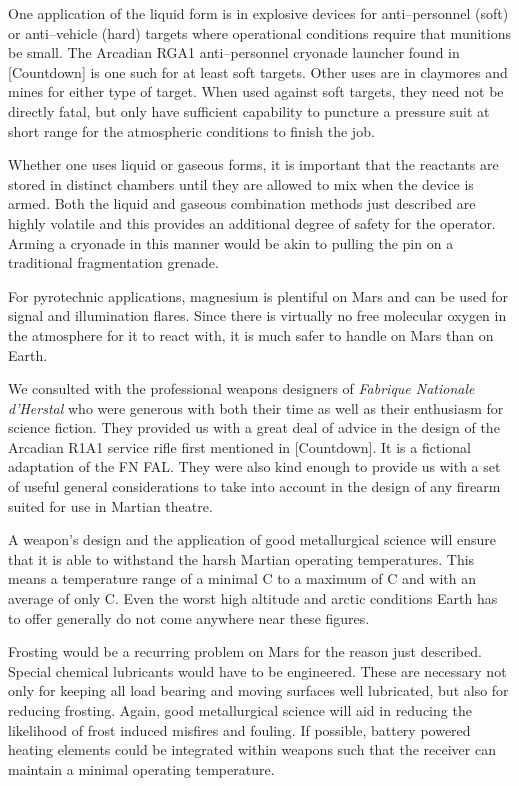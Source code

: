 One application of the liquid form is in explosive devices for anti--personnel (soft) or anti--vehicle (hard) targets where operational conditions require that munitions be small. The Arcadian RGA1 anti--personnel cryonade launcher found in [Countdown] is one such for at least soft targets. Other uses are in claymores and mines for either type of target. When used against soft targets, they need not be directly fatal, but only have sufficient capability to puncture a pressure suit at short range for the atmospheric conditions to finish the job.

Whether one uses liquid or gaseous forms, it is important that the reactants are stored in distinct chambers until they are allowed to mix when the device is armed. Both the liquid and gaseous combination methods just described are highly volatile and this provides an additional degree of safety for the operator. Arming a cryonade in this manner would be akin to pulling the pin on a traditional fragmentation grenade.

For pyrotechnic applications, magnesium is plentiful on Mars and can be used for signal and illumination flares. Since there is virtually no free molecular oxygen in the atmosphere for it to react with, it is much safer to handle on Mars than on Earth.


We consulted with the professional weapons designers of {\it Fabrique Nationale d'Herstal} who were generous with both their time as well as their enthusiasm for science fiction. They provided us with a great deal of advice in the design of the Arcadian R1A1 service rifle first mentioned in [Countdown]. It is a fictional adaptation of the FN FAL. They were also kind enough to provide us with a set of useful general considerations to take into account in the design of any firearm suited for use in Martian theatre.

A weapon's design and the application of good metallurgical science will ensure that it is able to withstand the harsh Martian operating temperatures. This means a temperature range of a minimal C to a maximum of C and with an average of only C. Even the worst high altitude and arctic conditions Earth has to offer generally do not come anywhere near these figures. 

Frosting would be a recurring problem on Mars for the reason just described. Special chemical lubricants would have to be engineered. These are necessary not only for keeping all load bearing and moving surfaces well lubricated, but also for reducing frosting. Again, good metallurgical science will aid in reducing the likelihood of frost induced misfires and fouling. If possible, battery powered heating elements could be integrated within weapons such that the receiver can maintain a minimal operating temperature.

